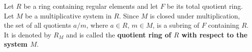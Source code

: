 Let $R$ be a ring containing regular elements and let $F$ be its total quotient ring. Let $M$ be a multiplicative system in $R$. Since $M$ is closed under multiplication, the set of all quotients $a/m$, where $a \in R$, $m \in M$, is a subring of $F$ containing $R$. It is denoted by $R_M$ and is called the \textbf{quotient ring of $R$ with respect to the system $M$}.
